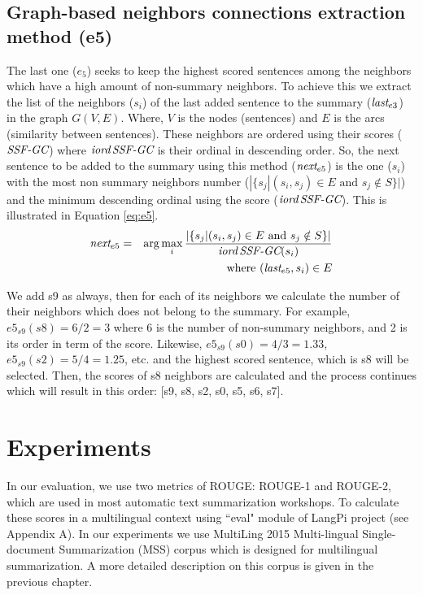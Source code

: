 \subsection{Graph-based neighbors connections extraction method (e5)}

The last one ($ e_5 $) seeks to keep the highest scored sentences among the neighbors which have a high amount of non-summary neighbors. 
To achieve this we extract the list of the neighbors ($s_i$) of the last added sentence to the summary ($\operatorname{\textit{last}}_{e3}$) in the graph $ G(V, E) $.
Where, $ V $ is the nodes (sentences) and $ E $ is the arcs (similarity between sentences).
These neighbors are ordered using their scores ($\operatorname{\textit{SSF-GC}}$) where $\operatorname{\textit{iord}}\operatorname{\textit{SSF-GC}}$ is their ordinal in descending order.
So, the next sentence to be added to the summary using this method ($\operatorname{\textit{next}}_{e5}$) is the one ($s_i$) with the most non summary neighbors number ($|\{ s_j | (s_i, s_j) \in E \text{ and } s_j \notin S \}|$) and the minimum descending ordinal using the score ($\operatorname{\textit{iord}}\operatorname{\textit{SSF-GC}}$).
This is illustrated in Equation \ref{eq:e5}.
\begin{equation}
	\begin{aligned}
		\operatorname{\textit{next}}_{e5} & = & \arg\max\limits_i \frac{|\{ s_j | (s_i, s_j) \in E \text{ and } s_j \notin S \}|}{\operatorname{\textit{iord}}\operatorname{\textit{SSF-GC}}(s_i)} \\
		&& \text{ where } (\operatorname{\textit{last}}_{e5}, s_i) \in E \\
	\end{aligned}
	\label{eq:e5}
\end{equation}

We add s9 as always, then for each of its neighbors we calculate the number of their neighbors which does not belong to the summary. 
For example, $ e5_{s9}(s8) = 6/2 = 3 $ where 6 is the number of non-summary neighbors, and 2 is its order in term of the score. 
Likewise, $ e5_{s9}(s0) = 4/3 = 1.33 $, $ e5_{s9}(s2) = 5/4 = 1.25 $, etc. and the highest scored sentence, which is s8 will be selected.
Then, the scores of s8 neighbors are calculated and the process continues which will result in this order: [s9, s8, s2, s0, s5, s6, s7].


\section{Experiments}

In our evaluation, we use two metrics of ROUGE: ROUGE-1 and ROUGE-2, which are used in most automatic text summarization workshops.
To calculate these scores in a multilingual context using ``eval" module of LangPi project (see Appendix A). 
In our experiments we use MultiLing 2015 Multi-lingual Single-document Summarization (MSS) corpus which is designed for multilingual summarization. 
A more detailed description on this corpus is given in the previous chapter.

